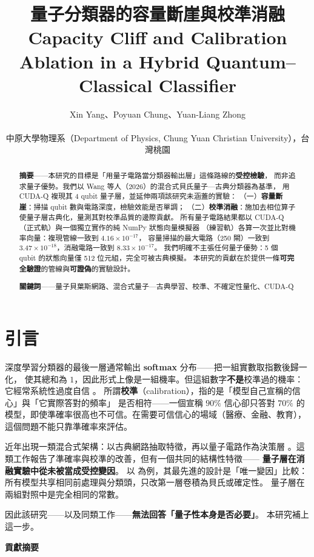 \documentclass[11pt,a4paper]{ctexart}
\title{量子分類器的容量斷崖與校準消融\\[0.35em]\large Capacity Cliff and Calibration Ablation in a Hybrid Quantum--Classical Classifier}
\author{Xin Yang、Poyuan Chung、Yuan-Liang Zhong\\\parbox{0.86\textwidth}{\centering 中原大學物理系（Department of Physics, Chung Yuan Christian University），台灣桃園}}
\date{}
\begin{document}
\maketitle

\begin{abstract}
\textbf{摘要}------本研究的目標是「用量子電路當分類器輸出層」這條路線的\textbf{受控檢驗}，
而非追求量子優勢。我們以 Wang
等人（2026）的混合式貝氏量子---古典分類器為基準， 用 CUDA-Q 複現其 4
qubit 量子層，並延伸兩項該研究未涵蓋的實驗：
（一）\textbf{容量斷崖}：掃描 qubit 數與電路深度，檢驗效能是否單調；
（二）\textbf{校準消融}：施加去相位算子使量子層古典化，量測其對校準品質的邊際貢獻。
所有量子電路結果都以 CUDA-Q（正式軌）與一個獨立實作的純 NumPy
狀態向量模擬器 （練習軌）各算一次並比對機率向量：複現管線一致到
\(4.16 \times 10^{- 17}\)， 容量掃描的最大電路（250 閘）一致到
\(3.47 \times 10^{- 18}\)，消融電路一致到 \(8.33 \times 10^{- 17}\)。
我們明確不主張任何量子優勢：5 個 qubit 的狀態向量僅 512
位元組，完全可被古典模擬。
本研究的貢獻在於提供一條\textbf{可完全驗證}的管線與\textbf{可證偽}的實驗設計。

\textbf{關鍵詞}------量子貝葉斯網路、混合式量子---古典學習、校準、不確定性量化、CUDA-Q
\end{abstract}
\section{引言}

深度學習分類器的最後一層通常輸出 \textbf{softmax}
分布------把一組實數取指數後歸一化， 使其總和為
\(1\)，因此形式上像是一組機率。但這組數字\textbf{不是}校準過的機率：
它經常系統性過度自信 \cite{guo2017}。
所謂\textbf{校準}（calibration），指的是「模型自己宣稱的信心」與「它實際答對的頻率」
是否相符------一個宣稱 \(90\%\) 信心卻只答對 \(70\%\)
的模型，即使準確率很高也不可信。在需要可信信心的場域（醫療、金融、教育），這個問題不能只靠準確率來評估。

近年出現一類混合式架構：以古典網路抽取特徵，再以量子電路作為決策層
\cite{wang2026}。這類工作報告了準確率與校準的改善，但有一個共同的結構性特徵------
\textbf{量子層在消融實驗中從未被當成受控變因}。 以 \cite{wang2026}
為例，其最先進的設計是「唯一變因」比較：
所有模型共享相同前處理與分類頭，只改第一層卷積為貝氏或確定性。
量子層在兩組對照中是完全相同的常數。

因此該研究------以及同類工作------\textbf{無法回答「量子性本身是否必要」}。
本研究補上這一步。

\textbf{貢獻摘要}
\end{document}
